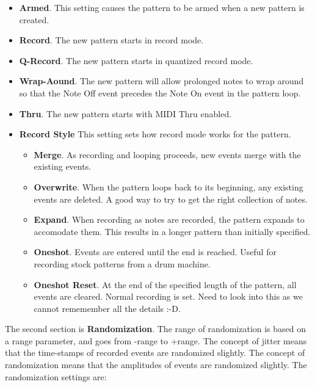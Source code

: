    \begin{itemize}
      \item \textbf{Armed}.
         This setting causes the pattern to be armed when a new pattern
         is created.
      \item \textbf{Record}.
         The new pattern starts in record mode.
      \item \textbf{Q-Record}.
         The new pattern starts in quantized record mode.
      \item \textbf{Wrap-Aound}.
         The new pattern will allow prolonged notes to wrap around so
         that the Note Off event precedes the Note On event in the
         pattern loop.
      \item \textbf{Thru}.
         The new pattern starts with MIDI Thru enabled.
      \item \textbf{Record Style}
         This setting sets how record mode works for the pattern.
         \begin{itemize}
            \item \textbf{Merge}.
               As recording and looping proceeds, new events merge with
               the existing events.
            \item \textbf{Overwrite}.
               When the pattern loops back to its beginning, any
               existing events are deleted.
               A good way to try to get the right collection of notes.
            \item \textbf{Expand}.
               When recording as notes are recorded, the pattern expands to
               accomodate them.
               This results in a longer pattern than initially specified.
            \item \textbf{Oneshot}.
               Events are entered until the end is reached.
               Useful for recording stock patterns from a drum machine.
            \item \textbf{Oneshot Reset}.
               At the end of the specified length of the pattern,
               all events are cleared.
               Normal recording is set.
               Need to look into this as we cannot rememember all the
               details :-D.
         \end{itemize}
   \end{itemize}

   The second section is \textbf{Randomization}.
   The range of randomization is based on a range parameter, and
   goes from -range to +range.
   The concept of jitter means that the time-stamps of recorded events
   are randomized slightly.
   The concept of randomization means that the amplitudes of events
   are randomized slightly.
   The randomization settings are:

